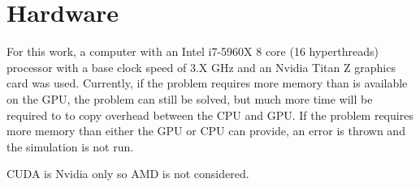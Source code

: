 \section{Hardware}\label{sec:hardware}
For this work, a computer with an Intel i7-5960X 8 core (16 hyperthreads) processor with a base clock speed of 3.X GHz and an Nvidia Titan Z graphics card was used. Currently, if the problem requires more memory than is available on the GPU, the problem can still be solved, but much more time will be required to to copy overhead between the CPU and GPU. If the problem requires more memory than either the GPU or CPU can provide, an error is thrown and the simulation is not run.

CUDA is Nvidia only so AMD is not considered.

\endinput
